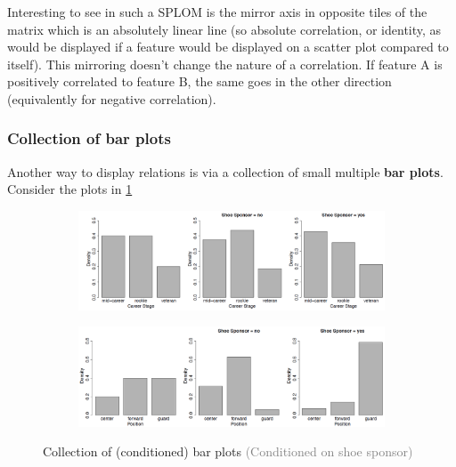 Interesting to see in such a SPLOM is the mirror axis in opposite tiles of the matrix which is an absolutely linear line (so absolute correlation, or identity, as would be displayed if a feature would be displayed on a scatter plot compared to itself). This mirroring doesn't change the nature of a correlation. If feature A is positively correlated to feature B, the same goes in the other direction (equivalently for negative correlation).

\subsubsection*{Collection of bar plots}

Another way to display relations is via a collection of small multiple \textbf{bar plots}. Consider the plots in \ref{fig:2_barplot}

\begin{figure}[h]
  \centering
  \begin{subfigure}{0.85\textwidth}
    \centering
    \includegraphics[width=\textwidth]{assets/visualization_and_extraction/feature_relation/bar_no.png}
  \end{subfigure}
  
  \vspace*{0.2cm}

  \begin{subfigure}{0.8\textwidth}
    \centering
    \includegraphics[width=\textwidth]{assets/visualization_and_extraction/feature_relation/bar_strong.png}
  \end{subfigure}
  \caption{Collection of (conditioned) bar plots \textcolor{gray}{\footnotesize (Conditioned on shoe sponsor)}}
  \label{fig:2_barplot}
\end{figure}

